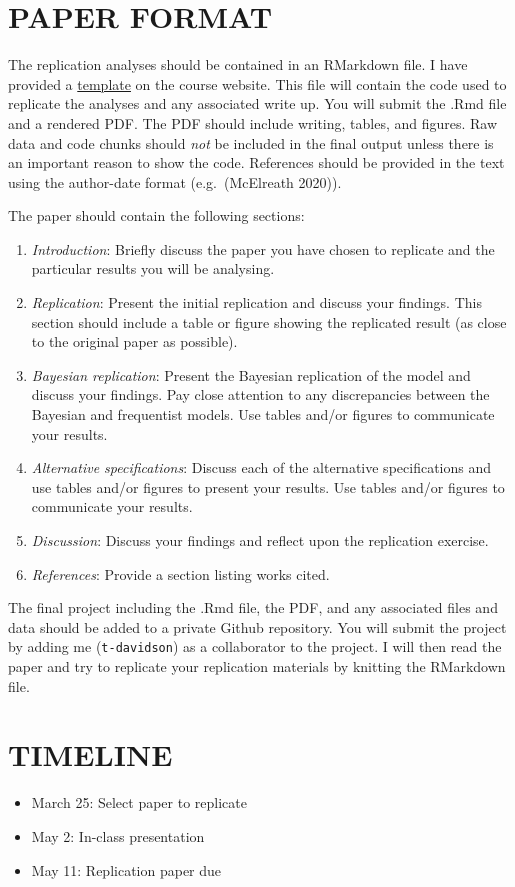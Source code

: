 \documentclass[
  12pt,
]{article}
\providecommand{\tightlist}{%
  \setlength{\itemsep}{0pt}\setlength{\parskip}{0pt}}
\begin{document}
\hypertarget{paper-format}{%
\section{PAPER FORMAT}\label{paper-format}}

The replication analyses should be contained in an RMarkdown file. I
have provided a
\href{https://github.com/t-davidson/SOC542-S22/blob/main/project/template.Rmd}{template}
on the course website. This file will contain the code used to replicate
the analyses and any associated write up. You will submit the .Rmd file
and a rendered PDF. The PDF should include writing, tables, and figures.
Raw data and code chunks should \emph{not} be included in the final
output unless there is an important reason to show the code. References
should be provided in the text using the author-date format
(e.g.~(McElreath 2020)).

The paper should contain the following sections:

\begin{enumerate}
\def\labelenumi{\arabic{enumi}.}
\tightlist
\item
  \emph{Introduction}: Briefly discuss the paper you have chosen to
  replicate and the particular results you will be analysing.
\item
  \emph{Replication}: Present the initial replication and discuss your
  findings. This section should include a table or figure showing the
  replicated result (as close to the original paper as possible).
\item
  \emph{Bayesian replication}: Present the Bayesian replication of the
  model and discuss your findings. Pay close attention to any
  discrepancies between the Bayesian and frequentist models. Use tables
  and/or figures to communicate your results.
\item
  \emph{Alternative specifications}: Discuss each of the alternative
  specifications and use tables and/or figures to present your results.
  Use tables and/or figures to communicate your results.
\item
  \emph{Discussion}: Discuss your findings and reflect upon the
  replication exercise.
\item
  \emph{References}: Provide a section listing works cited.
\end{enumerate}

The final project including the .Rmd file, the PDF, and any associated
files and data should be added to a private Github repository. You will
submit the project by adding me (\texttt{t-davidson}) as a collaborator
to the project. I will then read the paper and try to replicate your
replication materials by knitting the RMarkdown file.

\hypertarget{timeline}{%
\section{TIMELINE}\label{timeline}}

\begin{itemize}
\tightlist
\item
  March 25: Select paper to replicate
\item
  May 2: In-class presentation
\item
  May 11: Replication paper due
\end{itemize}
\end{document}
